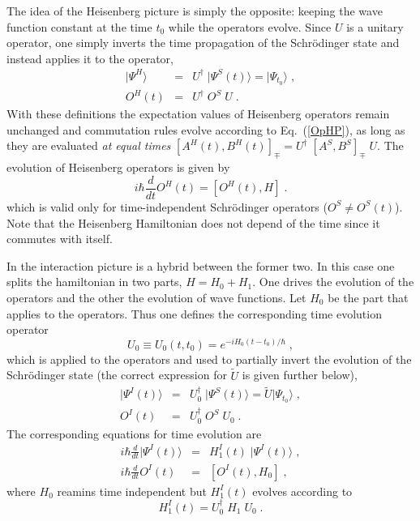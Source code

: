 The idea of the Heisenberg picture is simply the opposite: keeping the wave function constant at the time $t_0$ while the operators evolve. Since $U$ is a unitary operator, one simply inverts the time propagation of the Schr\"odinger state and instead applies it to the operator,
\begin{eqnarray}
\vert\Psi^H\rangle &=& U^\dag \; \vert\Psi^S(t)\rangle = \vert\Psi_{t_0} \rangle  \; ,
\label{PhiHP}
\\
 O^H(t) &=& U^\dag \; O^S \; U  \; .
\label{OpHP}
\end{eqnarray}
With these definitions the expectation values of Heisenberg operators remain unchanged and commutation rules evolve according to Eq.~(\ref{OpHP}), as long as they are evaluated {\em at equal times} $[A^H(t),B^H(t)]_\mp=U^\dag \; [A^S,B^S]_\mp \; U $.
The evolution of Heisenberg operators is given by
\begin{equation}
 i \hbar \frac{d}{d t}  O^H(t) = \left[ O^H(t) , H \right] \; .
\label{HPTimeEvol}
\end{equation}
which is valid only for time-independent Schr\"odinger operators ($O^S\neq O^S(t)$). Note that the Heisenberg Hamiltonian does not depend of the time since it commutes with itself.


In the interaction picture is a hybrid between the former two. In this case one splits the hamiltonian in two parts, $H=H_0+H_1$. One drives the evolution of the operators and the other the evolution of wave functions.
Let $H_0$ be the part that applies to the operators. Thus one defines the corresponding time evolution operator
\begin{equation}
 U_0 \equiv U_0(t, t_0) = e^{-i H_0 (t-t_0)/\hbar} \; ,
\label{IPTimeEvol}
\end{equation}
which is applied to the operators and used to partially invert the evolution of the Schr\"odinger state (the correct expression for $\tilde{U}$ is given further below),
\begin{eqnarray}
\vert\Psi^I(t)\rangle &=& U_0^\dag \; \vert\Psi^S(t)\rangle = \tilde{U} \vert\Psi_{t_0} \rangle \; ,
\label{PhiIP}
\\
 O^I(t) &=& U_0^\dag \; O^S \; U_0  \; .
\label{OpIP}
\end{eqnarray}
The corresponding equations for time evolution are
\begin{eqnarray}
i \hbar \frac{d}{d t} \vert\Psi^I(t)\rangle&=&H^I_1(t) \; \vert\Psi^I(t)\rangle
 \; ,
\label{PhiIPEvol} \\
 i \hbar \frac{d}{d t}  O^I(t)&=&\left[ O^I(t) , H_0\right]
 \; ,
 \label{OpIPEvol}
\end{eqnarray}
where $H_0$ reamins time independent but $H^I_1(t)$ evolves according to
\begin{equation}
 H^I_1(t) = U_0^\dag \; H_1 \; U_0  \; .
\label{HITimeEvol}
\end{equation}


